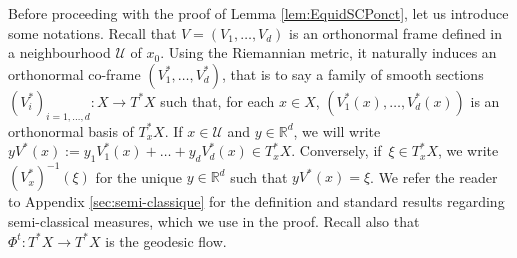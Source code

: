 \documentclass[10pt]{amsart}
\let\mathcal\mathscr
\theoremstyle{plain}
\theoremstyle{definition}
\newcommand{\R}{\mathbb{R}}
\def\calU{\mathcal{U}}
\begin{document}
Before proceeding with the proof of Lemma \ref{lem:EquidSCPonct}, let us introduce some notations. Recall that $V=(V_1,\dots,V_d)$ is an orthonormal frame defined in a neighbourhood $\calU$ of $x_0$. Using the Riemannian metric, it naturally induces an orthonormal co-frame $(V_1^*,\dots,V_d^*)$, that is to say a family of smooth sections $(V_i^*)_{i=1,\dots,d} : X\to T^*X$ such that, for each $x\in X$, $(V^*_1(x),\dots,V^*_d(x))$ is an orthonormal basis of $T_x^*X$. If $x\in \mathcal{U}$ and $y\in \R^d$, we will write $yV^*(x) := y_1 V^*_1(x)+\dots +y_d V^*_d(x) \in T_x^*X$. Conversely, if~$\xi \in T_x^*X$, we write $(V_x^*)^{-1}(\xi)$ for the unique $y\in \R^d$ such that $yV^*(x)= \xi$. We refer the reader to Appendix \ref{sec:semi-classique} for the definition and standard results regarding semi-classical measures, which we use in the proof. Recall also that $\Phi^t:T^*X\to T^*X$ is the geodesic flow.\enlargethispage{1.5\baselineskip}%
\end{document}
